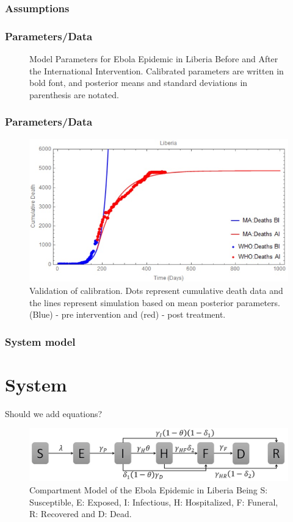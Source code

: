 \documentclass[30pt]{beamer}
\begin{document}
\begin{frame}
\frametitle{Assumptions}
\end{frame}

\begin{frame}
\frametitle{Parameters/Data}
\begin{figure}[!h]
  \centering
  \caption{Model Parameters for Ebola Epidemic in Liberia Before and After the International Intervention. Calibrated parameters are written in bold font, and posterior means and standard deviations in parenthesis are notated. } 
\label{fig:compartment} 
\end{figure}
\end{frame}

\begin{frame}
\frametitle{Parameters/Data}
\begin{figure}[!h]
  \centering
  \includegraphics[width=1\textwidth]{CumulativeDeathMathematica}
  \caption{Validation of calibration. Dots represent cumulative death data and the lines represent simulation
based on mean posterior parameters. (Blue) - pre intervention and (red) - post treatment.} 
\end{figure}
\end{frame}


\begin{frame}
\frametitle{System model}
\section{System}
Should we add equations?

\begin{figure}[!h]
  \centering
  \includegraphics[width=1\textwidth]{compartment}
  \caption{Compartment Model of the Ebola Epidemic in Liberia \newline  Being S: Susceptible, E: Exposed, I: Infectious, H: Hospitalized, F: Funeral,  R: Recovered and D: Dead. } 
\end{figure}
\end{frame}
\end{document}
